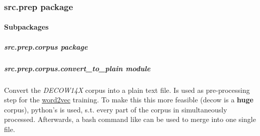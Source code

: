 \documentclass[letterpaper,10pt,english]{sphinxmanual}
\begin{document}
\subsubsection{src.prep package}
\label{src.prep::doc}\label{src.prep:src-prep-package}

\paragraph{Subpackages}
\label{src.prep:subpackages}

\subparagraph{src.prep.corpus package}
\label{src.prep.corpus::doc}\label{src.prep.corpus:src-prep-corpus-package}

\subparagraph{src.prep.corpus.convert\_to\_plain module}
\label{src.prep.corpus:src-prep-corpus-convert-to-plain-module}\label{src.prep.corpus:module-src.prep.corpus.convert_to_plain}
Convert the \emph{DECOW14X} corpus into a plain text file. Is used as pre-processing step for the
\href{https://code.google.com/archive/p/word2vec/}{word2vec} training.
To make this this more feasible (decow is a \textbf{huge} corpus), python's  is used, s.t. every
part of the corpus in simultaneously processed. Afterwards, a bash command like  can be used to merge into one
single file.
\end{document}
